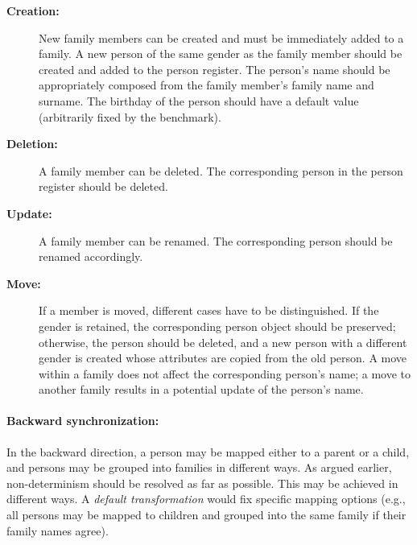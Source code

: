 \begin{description}
    \item[\textbf{Creation:}]
    New family members can be created and must be immediately added to a family.
    A new person of the same gender as the family member should be created and added to the person register.
    The person's name should be appropriately composed from the family member's family name and surname.
    The birthday of the person should have a default value (arbitrarily fixed by the benchmark). 
    
    \item[\textbf{Deletion:}]
    A family member can be deleted.  The corresponding person in the person register should be deleted.
    
    \item[\textbf{Update:}]
    A family member can be renamed.  The corresponding person should be renamed accordingly.
    
    \item[\textbf{Move:}]
    If a member is moved, different cases have to be distinguished.
    If the gender is retained, the corresponding person object should be preserved; otherwise, the person should be deleted, and a new person with a different gender is created whose attributes are copied from the old person. 
    A move within a family does not affect the corresponding person's name; a move to another family results in a potential update of the person's name.
\end{description}


\paragraph{Backward synchronization:}

In the backward direction, a person may be mapped either to a parent or a child, and persons may be grouped into families in different ways. As argued earlier, non-determinism should be resolved as far as possible. This may be achieved in different ways. A \emph{default transformation} would fix specific mapping options (e.g., all persons may be mapped to children and grouped into the same family if their family names agree). 



